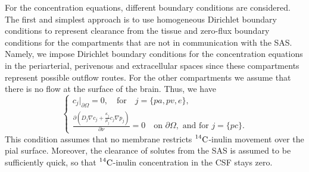 \documentclass[10pt]{article}
\newcommand{\1}{^{(1)}}
\newcommand{\2}{^{(2)}}
\newcommand{\Cinulin}{$\prescript{14}{}{\text{C}}$-inulin }
\begin{document}
For the concentration equations, different boundary conditions are considered. 
The first and simplest approach is to use homogeneous Dirichlet boundary conditions to represent clearance from the tissue and zero-flux boundary conditions for the compartments that are not in communication with the SAS. Namely, we impose Dirichlet boundary conditions for the concentration equations in the periarterial, perivenous and extracellular spaces since these compartments represent possible outflow routes. For the other compartments we assume that there is no flow at the surface of the brain. Thus, we have
\begin{equation*}
    \begin{cases}
    c_j \big|_{\partial \Omega} =  0 ,\quad \text{for}\quad j=\{pa,pv,e \}, \label{eq:Dirichlet} \\
    \frac{\partial\left( D_j \nabla c_j + \frac{\kappa_j}{\mu_j}c_j \nabla p_j\right)}{\partial \nu}  = 0\quad \text{on } \partial \Omega, \text{ and for } j = \{pc\}.
    \end{cases}
\end{equation*}
This condition assumes that no membrane restricts \Cinulin movement over the pial surface. Moreover, the clearance of solutes from the SAS is assumed to be sufficiently quick, so that \Cinulin concentration in the CSF stays zero. 
\end{document}
